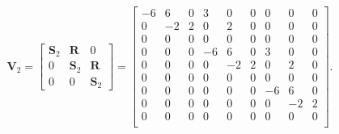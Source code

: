 \documentclass[hidelinks,11pt]{article}
\begin{document}
    \begin{equation*}
        \mathbf{V}_2 = \begin{bmatrix}
                           \mathbf{S}_2 & \mathbf{R} & 0 \\ 0 & \mathbf{S}_2 & \mathbf{R} \\ 0 & 0 & \mathbf{S}_2
        \end{bmatrix} = \left [
            \begin{array}{ccc|ccc|ccc}
                -6 & 6  & 0 & 3  & 0  & 0 & 0  & 0  & 0 \\
                0  & -2 & 2 & 0  & 2  & 0 & 0  & 0  & 0 \\
                0  & 0  & 0 & 0  & 0  & 0 & 0  & 0  & 0 \\
                \hline
                0  & 0  & 0 & -6 & 6  & 0 & 3  & 0  & 0 \\
                0  & 0  & 0 & 0  & -2 & 2 & 0  & 2  & 0 \\
                0  & 0  & 0 & 0  & 0  & 0 & 0  & 0  & 0 \\
                \hline
                0  & 0  & 0 & 0  & 0  & 0 & -6 & 6  & 0 \\
                0  & 0  & 0 & 0  & 0  & 0 & 0  & -2 & 2 \\
                0  & 0  & 0 & 0  & 0  & 0 & 0  & 0  & 0 \\
            \end{array}
            \right ].
    \end{equation*}
\end{document}
